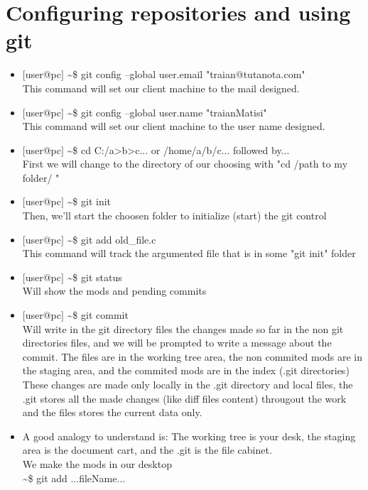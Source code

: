 \documentclass[12pt,a4paper]{article} %
\begin{document}
\section{Configuring repositories and using git}
\begin{itemize}
\item $[$user@pc$]$ \textasciitilde\$ git config  --global user.email "traian@tutanota.com"\\
This command will set our client machine to the mail designed.
\item $[$user@pc$]$ \textasciitilde\$ git config  --global user.name "traianMatisi"\\
This command will set our client machine to the user name designed.
\item $[$user@pc$]$ \textasciitilde\$ cd C:/a>b>c... or /home/a/b/c... followed by...\\
First we will change to the directory of our choosing with "cd /path to my folder/ "
\item $[$user@pc$]$ \textasciitilde\$ git init\\
Then, we'll start the choosen folder to initialize (start) the git control
\item $[$user@pc$]$ \textasciitilde\$ git add old\_file.c\\
This command will track the argumented file that is in some "git init" folder
\item $[$user@pc$]$ \textasciitilde\$ git status\\
Will show the mods and pending commits
\item $[$user@pc$]$ \textasciitilde\$ git commit\\
Will write in the git directory files the changes made so far in the non git directories files, and we will be prompted to write a message about the commit. The files are in the working tree area, the non commited mods are in the staging area, and the commited mods are in the index (.git directories)\\
These changes are made only locally in the .git directory and local files, the .git stores all the made changes (like diff files content) througout the work and the files stores the current data only.
\item A good analogy to understand is: The working tree is your desk, the staging area is the document cart, and the .git is the file cabinet.\\
We make the mods in our desktop\\
\tabto{1.1cm}\textasciitilde\$ git add ...fileName...\\

\end{itemize}
\end{document}
